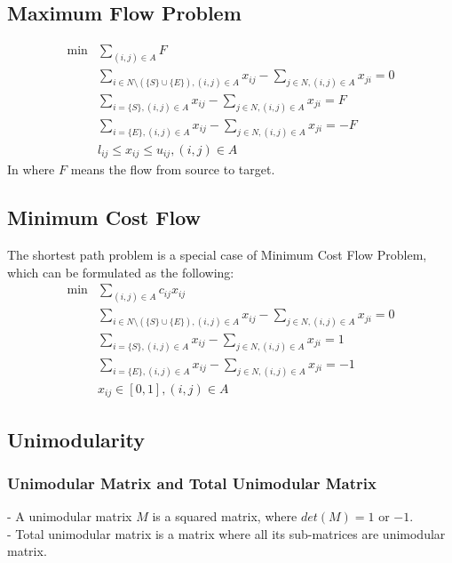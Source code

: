 			\subsection{Maximum Flow Problem}
				\begin{align}
					\min &\sum_{(i, j)\in A} F \\
					& \sum_{i \in N\setminus(\{S\}\cup\{E\}), (i,j)\in A} x_{ij} - \sum_{j \in N, (i,j)\in A} x_{ji} = 0 \\
					& \sum_{i=\{S\}, (i,j)\in A} x_{ij} - \sum_{j \in N, (i,j)\in A} x_{ji} = F \\
					& \sum_{i=\{E\}, (i,j)\in A} x_{ij} - \sum_{j \in N, (i,j)\in A} x_{ji} = -F \\
					& l_{ij} \le x_{ij} \le u_{ij}, (i,j)\in A 
				\end{align}
				In where $F$ means the flow from source to target.

			\subsection{Minimum Cost Flow}
				The shortest path problem is a special case of Minimum Cost Flow Problem, which can be formulated as the following:\\
				\begin{align}
					\min &\sum_{(i, j)\in A} c_{ij}x_{ij} \\
					& \sum_{i \in N\setminus(\{S\}\cup\{E\}), (i,j)\in A} x_{ij} - \sum_{j \in N, (i,j)\in A} x_{ji} = 0 \\
					& \sum_{i=\{S\}, (i,j)\in A} x_{ij} - \sum_{j \in N, (i,j)\in A} x_{ji} = 1 \\
					& \sum_{i=\{E\}, (i,j)\in A} x_{ij} - \sum_{j \in N, (i,j)\in A} x_{ji} = -1 \\
					& x_{ij} \in [0,1], (i,j)\in A 
				\end{align}				
			
			\subsection{Unimodularity}
				\subsubsection{Unimodular Matrix and Total Unimodular Matrix}
					- A unimodular matrix $M$ is a squared matrix, where $det(M)=1$ or $-1$.\\
					- Total unimodular matrix is a matrix where all its sub-matrices are unimodular matrix.

